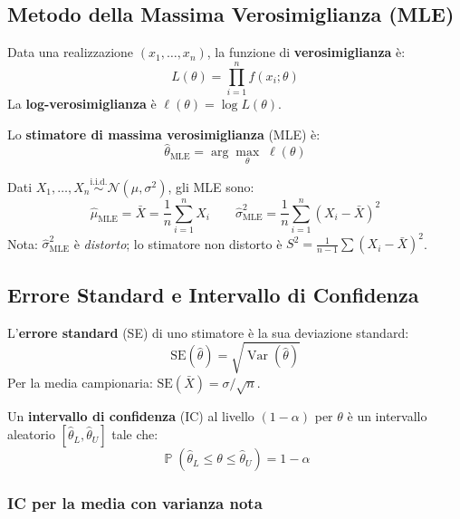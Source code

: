 \documentclass[12pt, a4paper]{article}
\DeclareMathOperator{\Var}{Var}
\DeclareMathOperator{\Prob}{\mathbb{P}}
\newcommand{\N}{\mathcal{N}}
\newcommand{\iid}{\overset{\text{i.i.d.}}{\sim}}
\begin{document}
\subsection{Metodo della Massima Verosimiglianza (MLE)}

\begin{definizione}
  Data una realizzazione $(x_1, \ldots, x_n)$, la funzione di
  \textbf{verosimiglianza} è:
  \[
    L(\theta) = \prod_{i=1}^{n} f(x_i; \theta)
  \]
  La \textbf{log-verosimiglianza} è $\ell(\theta) = \log L(\theta)$.
\end{definizione}

Lo \textbf{stimatore di massima verosimiglianza} (MLE) è:
\[
  \hat\theta_{\text{MLE}} = \arg\max_\theta\; \ell(\theta)
\]

\begin{esempio}
  Dati $X_1, \ldots, X_n \iid \N(\mu, \sigma^2)$, gli MLE sono:
  \[
    \hat\mu_{\text{MLE}} = \bar{X} = \frac{1}{n}\sum_{i=1}^n X_i
    \qquad
    \hat\sigma^2_{\text{MLE}} = \frac{1}{n}\sum_{i=1}^n (X_i - \bar{X})^2
  \]
  Nota: $\hat\sigma^2_{\text{MLE}}$ è \emph{distorto}; lo stimatore non
  distorto è $S^2 = \frac{1}{n-1}\sum (X_i-\bar{X})^2$.
\end{esempio}

\subsection{Errore Standard e Intervallo di Confidenza}

\begin{definizione}
  L'\textbf{errore standard} (SE) di uno stimatore è la sua deviazione
  standard:
  \[
    \text{SE}(\hat\theta) = \sqrt{\Var(\hat\theta)}
  \]
  Per la media campionaria: $\text{SE}(\bar{X}) = \sigma/\sqrt{n}$.
\end{definizione}

\begin{definizione}
  Un \textbf{intervallo di confidenza} (IC) al livello $(1-\alpha)$ per
  $\theta$ è un intervallo aleatorio $[\hat\theta_L, \hat\theta_U]$ tale che:
  \[
    \Prob(\hat\theta_L \le \theta \le \hat\theta_U) = 1 - \alpha
  \]
\end{definizione}

\subsubsection{IC per la media con varianza nota}
\end{document}
